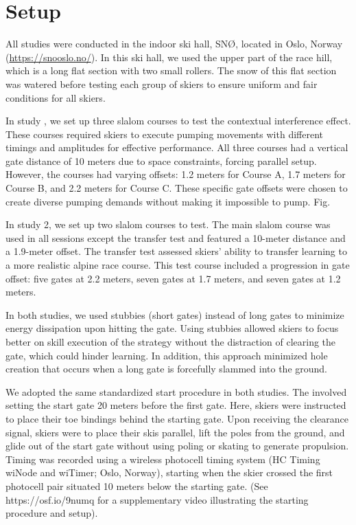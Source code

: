 \section{Setup}
All studies were conducted in the indoor ski hall, SNØ, located in Oslo, Norway (\url{https://snooslo.no/}). In this ski hall, we used the upper part of the race hill, which is a long flat section with two small rollers. The snow of this flat section was watered before testing each group of skiers to ensure uniform and fair conditions for all skiers. 

In study , we set up three slalom courses to test the contextual interference effect. These courses required skiers to execute pumping movements with different timings and amplitudes for effective performance. All three courses had a vertical gate distance of 10 meters due to space constraints, forcing parallel setup. However, the courses had varying offsets: 1.2 meters for Course A, 1.7 meters for Course B, and 2.2 meters for Course C. These specific gate offsets were chosen to create diverse pumping demands without making it impossible to pump. Fig. 

In study 2, we set up two slalom courses to test. The main slalom course was used in all sessions except the transfer test and featured a 10-meter distance and a 1.9-meter offset. The transfer test assessed skiers' ability to transfer learning to a more realistic alpine race course. This test course included a progression in gate offset: five gates at 2.2 meters, seven gates at 1.7 meters, and seven gates at 1.2 meters. 

In both studies, we used stubbies (short gates) instead of long gates to minimize energy dissipation upon hitting the gate\cite{minetti_biomechanics_2018}. Using stubbies allowed skiers to focus better on skill execution of the strategy without the distraction of clearing the gate, which could hinder learning. In addition, this approach minimized hole creation that occurs when a long gate is forcefully slammed into the ground. 

We adopted the same standardized start procedure in both studies. The involved setting the start gate 20 meters before the first gate. Here, skiers were instructed to place their toe bindings behind the starting gate. Upon receiving the clearance signal, skiers were to place their skis parallel, lift the poles from the ground, and glide out of the start gate without using poling or skating to generate propulsion. Timing was recorded using a wireless photocell timing system (HC Timing wiNode and wiTimer; Oslo, Norway), starting when the skier crossed the first photocell pair situated 10 meters below the starting gate. (See https://osf.io/9numq for a supplementary video illustrating the starting procedure and setup).


